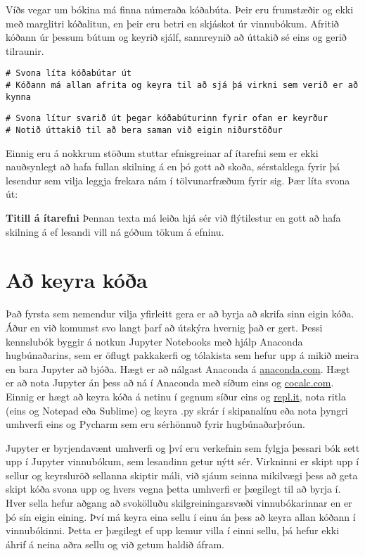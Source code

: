 Víðs vegar um bókina má finna númeraða kóðabúta.
Þeir eru frumstæðir og ekki með marglitri kóðalitun, en þeir eru betri en skjáskot úr vinnubókum.
Afritið kóðann úr þessum bútum og keyrið sjálf, sannreynið að úttakið sé eins og gerið tilraunir.
\lstset{style=uttak}
\lstset{style=venjulegt}
\begin{lstlisting}[caption=Kóðabútar kynntir til sögunnar]
# Svona líta kóðabútar út
# Kóðann má allan afrita og keyra til að sjá þá virkni sem verið er að kynna
\end{lstlisting}
\lstset{style=uttak}
\begin{lstlisting}
# Svona lítur svarið út þegar kóðabúturinn fyrir ofan er keyrður
# Notið úttakið til að bera saman við eigin niðurstöður
\end{lstlisting}
\lstset{style=venjulegt}

Einnig eru á nokkrum stöðum stuttar efnisgreinar af ítarefni sem er ekki nauðsynlegt að hafa fullan skilning á en þó gott að skoða, sérstaklega fyrir þá lesendur sem vilja leggja frekara nám í tölvunarfræðum fyrir sig.
Þær líta svona út:

\begin{itarefni}
\textbf{Titill á ítarefni}
Þennan texta má leiða hjá sér við flýtilestur en gott að hafa skilning á ef lesandi vill ná góðum tökum á efninu.
\end{itarefni}

\section{Að keyra kóða}\label{uk:keyra-koda}

Það fyrsta sem nemendur vilja yfirleitt gera er að byrja að skrifa sinn eigin kóða. 
Áður en við komumst svo langt þarf að útskýra hvernig það er gert. 
Þessi kennslubók byggir á notkun Jupyter Notebooks með hjálp Anaconda hugbúnaðarins, sem er öflugt pakkakerfi og tólakista sem hefur upp á mikið meira en bara Jupyter að bjóða. 
Hægt er að nálgast Anaconda á \href{www.anaconda.com}{anaconda.com}.
Hægt er að nota Jupyter án þess að ná í Anaconda með síðum eins og \href{www.cocalc.com}{cocalc.com}. 
Einnig er hægt að keyra kóða á netinu í gegnum síður eins og \href{www.repl.it}{repl.it}, nota ritla (eins og Notepad eða Sublime) og keyra .py skrár í skipanalínu eða nota þyngri umhverfi eins og Pycharm sem eru sérhönnuð fyrir hugbúnaðarþróun.

Jupyter er byrjendavænt umhverfi og því eru verkefnin sem fylgja þessari bók sett upp í Jupyter vinnubókum, sem lesandinn getur nýtt sér. 
Virkninni er skipt upp í sellur og keyrsluröð sellanna skiptir máli, við sjáum seinna mikilvægi þess að geta skipt kóða svona upp og hvers vegna þetta umhverfi er þægilegt til að byrja í. 
Hver sella hefur aðgang að svokölluðu skilgreiningarsvæði vinnubókarinnar en er þó sín eigin eining.
Því má keyra eina sellu í einu án þess að keyra allan kóðann í vinnubókinni.
Þetta er þægilegt ef upp kemur villa í einni sellu, þá hefur ekki áhrif á neina aðra sellu og við getum haldið áfram.

